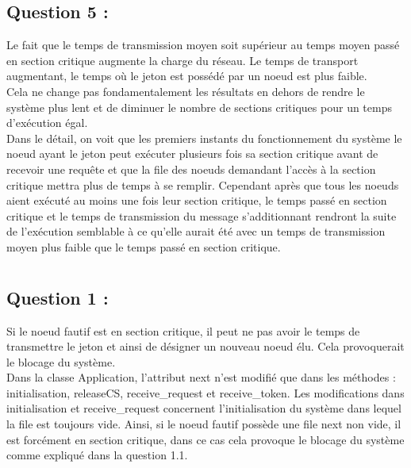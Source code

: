 \documentclass[11pt,a4paper]{report}
\begin{document}
\section{Question 5 :}

Le fait que le temps de transmission moyen soit supérieur au temps moyen passé en section critique augmente la charge du réseau. Le temps de transport augmentant, le temps où le jeton est possédé par un noeud est plus faible.\\

Cela ne change pas fondamentalement les résultats en dehors de rendre le système plus lent et de diminuer le nombre de sections critiques pour un temps d'exécution égal.\\

Dans le détail, on voit que les premiers instants du fonctionnement du système le noeud ayant le jeton peut exécuter plusieurs fois sa section critique avant de recevoir une requête et que la file des noeuds demandant l'accès à la section critique mettra plus de temps à se remplir. Cependant après que tous les noeuds aient exécuté au moins une fois leur section critique, le temps passé en section critique et le temps de transmission du message s'additionnant rendront la suite de l'exécution semblable à ce qu'elle aurait été avec un temps de transmission moyen plus faible que le temps passé en section critique.\\


\chapter{}

\section{Question 1 :}

 Si le noeud fautif est en section critique, il peut ne pas avoir le temps de transmettre le jeton et ainsi de désigner un nouveau noeud élu. Cela provoquerait le blocage du système.\\

 Dans la classe Application, l'attribut next n'est modifié que dans les méthodes : initialisation, releaseCS, receive\_request et receive\_token. Les modifications dans initialisation et receive\_request concernent l'initialisation du système dans lequel la file est toujours vide. Ainsi, si le noeud fautif possède une file next non vide, il est forcément en section critique, dans ce cas cela provoque le blocage du système comme expliqué dans la question 1.1.\\
\end{document}
